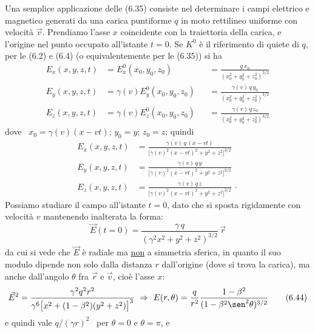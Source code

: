 Una semplice applicazione delle (6.35) consiste nel determinare i campi
elettrico e magnetico generati da una carica puntiforme $q$ in moto rettilineo
uniforme con velocit\`a $\vec v$. Prendiamo l'asse $x$ coincidente con la
traiettoria della carica, e l'origine nel punto occupato all'istante $t=0$. Se
$K^0$ \`e il riferimento di quiete di $q$, per le (6.2) e (6.4) \big(o
equivalentemente per le (6.35)\big) si ha
\begin{equation}
  \begin{aligned}
    E_x(x,y,z,t)&=E_x^0(x_0,y_0,z_0)
    &&=\frac{q\,x_0}{(x_0^2+y_0^2+z_0^2)^{3/2}}\\
    E_y(x,y,z,t)&=\gamma(v)E_y^0(x_0,y_0,z_0)
    &&=\frac{\gamma(v)\,q\,y_0}{(x_0^2+y_0^2+z_0^2)^{3/2}}\\
    E_z(x,y,z,t)&=\gamma(v)E_z^0(x_0,y_0,z_0)
    &&=\frac{\gamma(v)\,q\,z_0}{(x_0^2+y_0^2+z_0^2)^{3/2}}
  \end{aligned}
  \tag{6.41}
\end{equation}
dove \ $x_0=\gamma(v)(x-vt)$; \quad $y_0=y$; \quad $z_0=z$; \quad quindi
\begin{equation}
  \begin{aligned}
    E_x(x,y,z,t)
    &=\frac{\gamma(v)\,q\,(x-vt)}{\big[\gamma(v)^2(x-vt)^2+y^2+z^2\big]^{3/2}}\\
    E_y(x,y,z,t)
    &=\frac{\gamma(v)\,q\,y}{\big[\gamma(v)^2(x-vt)^2+y^2+z^2\big]^{3/2}}\\
    E_z(x,y,z,t)
    &=\frac{\gamma(v)\,q\,z}{\big[\gamma(v)^2(x-vt)^2+y^2+z^2\big]^{3/2}}\,\cdot
  \end{aligned}
  \tag{6.42}
\end{equation}
Possiamo studiare il campo all'istante $t=0$, dato che si sposta rigidamente con
velocit\`a $v$ mantenendo inalterata la forma:
\begin{equation}
  \vec E(t=0)=\frac{\gamma\,q}{(\gamma^2x^2+y^2+z^2)^{3/2}}\,\vec r
  \tag{6.43}
\end{equation}
da cui si vede che $\vec E$ \`e radiale ma \underline{non} a simmetria sferica,
in quanto il suo modulo dipende non solo dalla distanza $r$ dall'origine (dove
si trova la carica), ma anche dall'angolo $\theta$ fra $\vec r$ e $\vec v$,
cio\`e l'asse $x$:
\begin{equation}
  \vec E^2=\frac{\gamma^2q^2r^2}{\gamma^6\big[x^2+(1-\beta^2)(y^2+z^2)\big]^3}
  \ \Rightarrow
  \ E(r,\theta)=\frac{q}{r^2}\frac{1-\beta^2}{(1-\beta^2\sen^2\theta)^{3/2}}
  \tag{6.44}
\end{equation}
e quindi vale $q/(\gamma r)^2$ \ per $\theta=0$ e $\theta=\pi$, e
